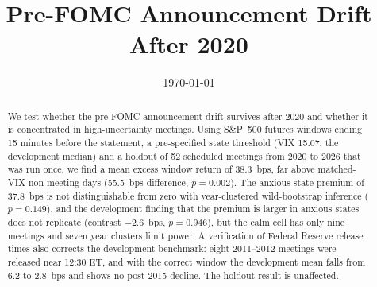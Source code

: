 \documentclass[11pt]{article}
\title{Pre-FOMC Announcement Drift After 2020}
\author{}
\date{\today}
\begin{document}
\maketitle

\begin{abstract}
We test whether the pre-FOMC announcement drift survives after 2020 and whether it is concentrated in high-uncertainty meetings. Using S\&P~500 futures windows ending 15 minutes before the statement, a pre-specified state threshold (VIX 15.07, the development median) and a holdout of 52 scheduled meetings from 2020 to 2026 that was run once, we find a mean excess window return of 38.3~bps, far above matched-VIX non-meeting days (55.5~bps difference, $p=0.002$). The anxious-state premium of 37.8~bps is not distinguishable from zero with year-clustered wild-bootstrap inference ($p=0.149$), and the development finding that the premium is larger in anxious states does not replicate (contrast $-2.6$~bps, $p=0.946$), but the calm cell has only nine meetings and seven year clusters limit power. A verification of Federal Reserve release times also corrects the development benchmark: eight 2011--2012 meetings were released near 12:30 ET, and with the correct window the development mean falls from 6.2 to 2.8~bps and shows no post-2015 decline. The holdout result is unaffected.
\end{abstract}












\appendix

\end{document}
